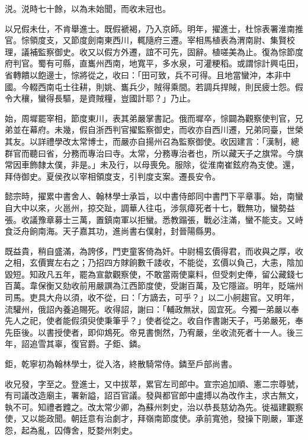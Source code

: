 \begin{pinyinscope}
 涚。涚時七十餘，以為未始聞，而收未冠也。



 以兄假未仕，不肯舉進士。既假褫褐，乃入京師。明年，擢進士，杜悰表署淮南推官。悰領度支，又節度劍南東西川，輒隨府三遷。宰相馬植表為渭南尉、集賢校理，議補監察御史。收又以假方外遷，誼不可先，固辭。植嗟美為止。復為悰節度府判官。蜀有可縣，直巂州西南，地寬平，多水泉，可灌粳稻。或謂悰計興屯田，省轉饋以飽邊士，悰將從之，收曰：「田可致，兵不可得。且地當蠻沖，本非中國。今輟西南屯士往耕，則姚、巂兵少，賊得乘間。若調兵捍賊，則民疲士怨。假令大穰，蠻得長驅，是資賊糧，豈國計耶？」乃止。



 始，周墀罷宰相，節度東川，表其弟嚴掌書記。俄而墀卒，悰闢為觀察使判官，兄弟並在幕府。未幾，假自浙西判官擢監察御史，而收亦自西川遷，兄弟同臺，世榮其友。以詳禮學改太常博士，而嚴亦自揚州召為監察御使。收因建言：「漢制，總群官而聽曰省，分務而專治曰寺。太常，分務專治者也，所以藏天子之旗常。今旗常因車飾隸太僕，非是。」未及行，以母喪免。服除，從淮南崔鉉府為支使。還，拜侍御史。夏侯孜以宰相領度支，引判度支案。遷長安令。



 懿宗時，擢累中書舍人、翰林學士承旨，以中書侍郎同中書門下平章事。始，南蠻自大中以來，火邕州，掠交趾，調華人往屯，涉氛瘴死者十七，戰無功，蠻勢益張。收議豫章募士三萬，置鎮南軍以拒蠻。悉教蹋張，戰必注滿，蠻不能支。又峙食泛舟餉南海。天子嘉其功，進尚書右僕射，封晉陽縣男。



 既益貴，稍自盛滿，為誇侈，門吏童客倚為奸。中尉楊玄價得君，而收與之厚，收之相，玄價實左右之；乃招四方賕餉數千諉收，不能從，玄價以負己，大恚，陰加毀短。知政凡五年，罷為宣歙觀察使，不敢當兩使稟料，但受刺史俸，留公藏錢七百萬。韋保衡又劾收前用嚴譔為江西節度使，受謝百萬，及它隱盜。明年，貶端州司馬。吏具大舟以須，收不從，曰：「方謫去，可乎？」以二小舸趨官。又明年，流驩州，俄詔內養追賜死。收得詔，謝曰：「輔政無狀，固宜死。今獨一弟嚴以奉先人之祀，使者能假須臾使秉筆乎？」使者從之。收自作書謝天子，丐弟嚴死，奉先臣後。以書授使者，即仰鴆死。帝見書惻然，乃宥嚴，坐收流死者十一人。後三年，詔追雪其辜，復官爵。子鉅、鏻。



 鉅，乾寧初為翰林學士，從入洛，終散騎常侍。鏻至戶部尚書。



 收兄發，字至之。登進士，又中拔萃，累官左司郎中。宣宗追加順、憲二宗尊號，有司議改造廟主，署新謚，詔百官議。發與都官郎中盧搏以為改作主，求古無文，執不可。知禮者韙之。改太常少卿，為蘇州刺史，治以恭長慈幼為先。徙福建觀察使，又以能政聞。朝廷意有治劇才，拜嶺南節度使。承前寬弛，發操下剛嚴，軍遂怨，起為亂，囚傳舍，貶婺州刺史。




\end{pinyinscope}
